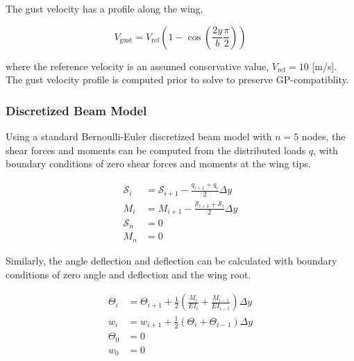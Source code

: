\documentclass[]{aiaa-tc}%
\begin{document}
The gust velocity has a profile along the wing\cite{acgust},

\begin{equation}
    \label{e:gustwind}
    V_{\text{gust}} = V_{\text{ref}} \left(1-\cos\left(\frac{2y}{b} \frac{\pi}{2} \right) \right)
\end{equation}

where the reference velocity is an assumed conservative value\cite{acgust}, $V_{\text{ref}} = 10$ [m/s]. The gust velocity profile is computed prior to solve to preserve GP-compatiblity.


\subsubsection{Discretized Beam Model}

Using a standard Bernoulli-Euler discretized beam model with $n=5$ nodes, the shear forces and moments can be computed from the distributed loads $q$, with boundary conditions of zero shear forces and moments at the wing tips.\cite{bending}

\begin{align}
    \label{e:shear}
    \mathcal{S}_i &= \mathcal{S}_{i+1} - \frac{q_{i+1} + q_i}{2}\Delta y \\
    \label{e:moment}
    M_i &= M_{i+1} - \frac{\mathcal{S}_{i+1} + \mathcal{S}_i}{2}\Delta y \\
    \label{e:shearboundary}
    \mathcal{S}_n &= 0 \\
    \label{e:momentboundary}
    M_n &= 0
\end{align}

Similarly, the angle deflection and deflection can be calculated with boundary conditions of zero angle and deflection and the wing root.\cite{bending}

\begin{align}
    \label{e:angle}
    \Theta_{i} &= \Theta_{i+1} + \frac{1}{2} \left(\frac{M_i}{EI_i} + \frac{M_{i-1}}{EI_{i-1}} \right) \Delta y \\
    \label{e:deflection}
    w_{i} &= w_{i+1} + \frac{1}{2} (\Theta_i + \Theta_{i-1}) \Delta y \\
    \label{e:angleboundary}
    \Theta_0 &= 0 \\
    \label{e:defboundary}
    w_0 &= 0 
\end{align}
 
\end{document}
